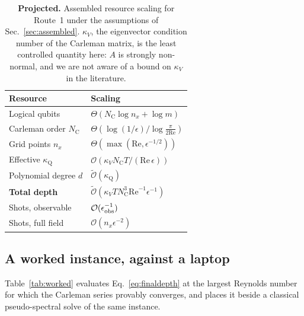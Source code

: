 \documentclass[aps,prx,twocolumn,notitlepage,superscriptaddress,floatfix,10pt]{revtex4-2}
\newcommand{\Rey}{\mathrm{Re}}
\newcommand{\Oh}{\mathcal{O}}
\newcommand{\Ot}{\widetilde{\mathcal{O}}}
\newcommand{\NC}{N_{\mathrm{C}}}
\newcommand{\kQ}{\kappa_{\mathrm{Q}}}
\begin{document}
\begin{table}[t]
\caption{\textbf{Projected.} Assembled resource scaling for Route~1 under the assumptions of
Sec.~\ref{sec:assembled}. $\kappa_V$, the eigenvector condition number of the Carleman matrix, is the
least controlled quantity here: $A$ is strongly non-normal, and we are not aware of a bound on
$\kappa_V$ in the literature.}
\label{tab:assembled}
\begin{ruledtabular}
\begin{tabular}{lp{3.6cm}}
Resource & Scaling \\
\hline
Logical qubits & $\Theta(\NC\log n_x+\log m)$ \\
Carleman order $\NC$ & $\Theta(\log(1/\epsilon)/\log\tfrac{\pi}{2\Rey})$ \\
Grid points $n_x$ & $\Theta(\max(\Rey,\epsilon^{-1/2}))$ \\
Effective $\kQ$ & $\Oh(\kappa_V\NC T/(\Rey\,\epsilon))$ \\
Polynomial degree $d$ & $\Ot(\kQ)$ \\
\textbf{Total depth} & $\Ot(\kappa_V T\NC^{3}\Rey^{-1}\epsilon^{-1})$ \\
Shots, observable & $\Oh(\epsilon_{\rm obs}^{-1})$ \\
Shots, full field & $\Oh(n_x\epsilon^{-2})$ \\
\end{tabular}
\end{ruledtabular}
\end{table}

\subsection{A worked instance, against a laptop}

Table~\ref{tab:worked} evaluates Eq.~\eqref{eq:finaldepth} at the largest Reynolds number for which
the Carleman series provably converges, and places it beside a classical pseudo-spectral solve of the
same instance.
\end{document}
